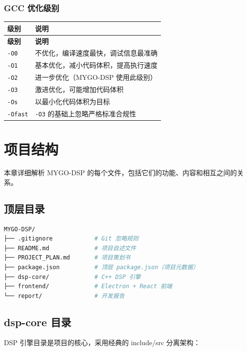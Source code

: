 ﻿\documentclass[12pt,a4paper,oneside]{ctexbook}
\begin{document}
\subsection{GCC 优化级别}

\begin{longtable}{p{2cm}p{11cm}}
    \toprule
    \textbf{级别} & \textbf{说明} \\
    \midrule
    \endfirsthead
    \toprule
    \textbf{级别} & \textbf{说明} \\
    \midrule
    \endhead
    \bottomrule
    \endfoot
    \texttt{-O0} & 不优化，编译速度最快，调试信息最准确 \\
    \texttt{-O1} & 基本优化，减小代码体积，提高执行速度 \\
    \texttt{-O2} & 进一步优化（MYGO-DSP 使用此级别） \\
    \texttt{-O3} & 激进优化，可能增加代码体积 \\
    \texttt{-Os} & 以最小化代码体积为目标 \\
    \texttt{-Ofast} & \texttt{-O3} 的基础上忽略严格标准合规性 \\
    \bottomrule
\end{longtable}

\chapter{项目结构}

本章详细解析 MYGO-DSP 的每个文件，包括它们的功能、内容和相互之间的关系。

\section{顶层目录}

\begin{lstlisting}[language=bash, caption={项目顶层结构}]
MYGO-DSP/
├── .gitignore            # Git 忽略规则
├── README.md             # 项目自述文件
├── PROJECT_PLAN.md       # 项目策划书
├── package.json          # 顶层 package.json（项目元数据）
├── dsp-core/             # C++ DSP 引擎
├── frontend/             # Electron + React 前端
└── report/               # 开发报告
\end{lstlisting}

\section{dsp-core 目录}

DSP 引擎目录是项目的核心，采用经典的 include/src 分离架构：
\end{document}
